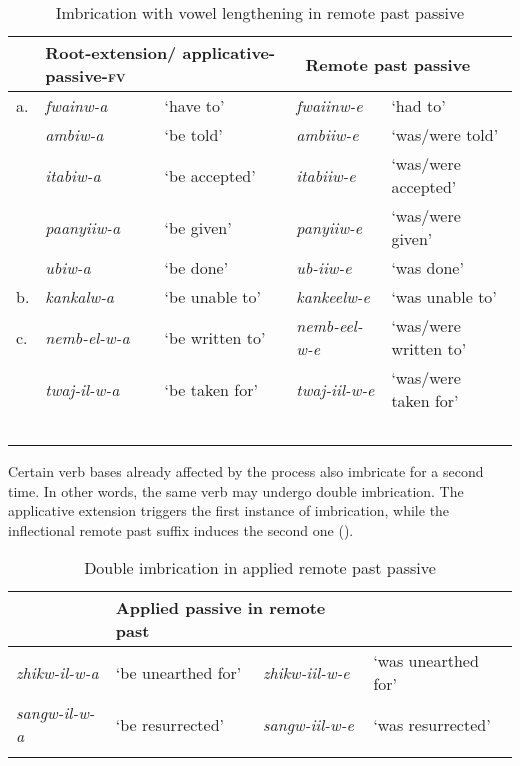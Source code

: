 \documentclass[output=paper]{langsci/langscibook}
\begin{document}
\begin{table} 
\begin{tabularx}{\textwidth}{llXll}
\lsptoprule
 & \multicolumn{2}{p{4cm}}{Root-extension/ applicative-passive-\textsc{fv}}  & \multicolumn{2}{p{4cm}}{~\newline Remote past passive} \\
\midrule
a. & \textit{fwainw-a} & `have to' & \textit{fwaiinw-e} & `had to' \\
 & \textit{ambiw-a} & `be told' & \textit{ambiiw-e} & `was/were told' \\
 & \textit{itabiw-a} & `be accepted' & \textit{itabiiw-e} & `was/were accepted' \\
 & \textit{paanyiiw-a} & `be given' & \textit{panyiiw-e} & `was/were given' \\
 & \textit{ubiw-a} & `be done' & \textit{ub-iiw-e} & `was done' \\
\tablevspace
b. & \textit{kankalw-a} & `be unable to' & \textit{kankeelw-e} & `was unable to' \\
\tablevspace
c. & \textit{nemb-el-w-a} & `be written to' & \textit{nemb-eel-w-e} & `was/were written to' \\
 & \textit{twaj-il-w-a} & `be taken for' & \textit{twaj-iil-w-e} & `was/were taken for' \\
\lspbottomrule
~\\\end{tabularx} 

\caption{Imbrication with vowel lengthening in remote past passive}
\label{tab:26.kawasha}

\end{table}

Certain verb bases already affected by the process also imbricate for a second time. In other words, the same verb may undergo double imbrication. The applicative extension triggers the first instance of imbrication, while the inflectional remote past suffix induces the second one ().

\begin{table} 
\small
\begin{tabularx}{\textwidth}{lXlX}
\lsptoprule
\multicolumn{2}{l}{Root-applicative-passive-\textsc{fv} }  & \multicolumn{2}{l}{Applied passive in remote past} \\
\midrule
\textit{zhikw-il-w-a} & `be unearthed for' & \textit{zhikw-iil-w-e} & `was unearthed for' \\
\textit{sangw-il-w-a} & `be resurrected' & \textit{sangw-iil-w-e} & `was resurrected' \\

\lspbottomrule
\end{tabularx} 

\caption{Double imbrication in applied remote past passive}
\label{tab:27.kawasha}

\end{table}
\end{document}
